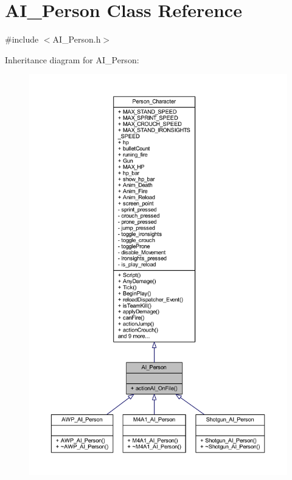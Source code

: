 \hypertarget{class_a_i___person}{}\section{A\+I\+\_\+\+Person Class Reference}
\label{class_a_i___person}


{\ttfamily \#include $<$A\+I\+\_\+\+Person.\+h$>$}



Inheritance diagram for A\+I\+\_\+\+Person\+:\nopagebreak
\begin{figure}[H]
\begin{center}
\leavevmode
\includegraphics[width=350pt]{class_a_i___person__inherit__graph}
\end{center}
\end{figure}


